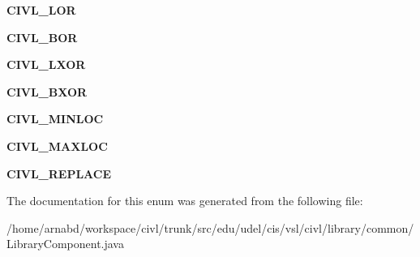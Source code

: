 \begin{DoxyCompactItemize}
\item 
\hypertarget{enumedu_1_1udel_1_1cis_1_1vsl_1_1civl_1_1library_1_1common_1_1LibraryComponent_1_1CIVLOperator_a0f51d482111de402fe99ec63ffc2816d}{}{\bfseries C\+I\+V\+L\+\_\+\+L\+O\+R}\label{enumedu_1_1udel_1_1cis_1_1vsl_1_1civl_1_1library_1_1common_1_1LibraryComponent_1_1CIVLOperator_a0f51d482111de402fe99ec63ffc2816d}

\item 
\hypertarget{enumedu_1_1udel_1_1cis_1_1vsl_1_1civl_1_1library_1_1common_1_1LibraryComponent_1_1CIVLOperator_a96b2269335390a319d3dca8747746c29}{}{\bfseries C\+I\+V\+L\+\_\+\+B\+O\+R}\label{enumedu_1_1udel_1_1cis_1_1vsl_1_1civl_1_1library_1_1common_1_1LibraryComponent_1_1CIVLOperator_a96b2269335390a319d3dca8747746c29}

\item 
\hypertarget{enumedu_1_1udel_1_1cis_1_1vsl_1_1civl_1_1library_1_1common_1_1LibraryComponent_1_1CIVLOperator_ab5b9c8c75602be56234c81f350859cab}{}{\bfseries C\+I\+V\+L\+\_\+\+L\+X\+O\+R}\label{enumedu_1_1udel_1_1cis_1_1vsl_1_1civl_1_1library_1_1common_1_1LibraryComponent_1_1CIVLOperator_ab5b9c8c75602be56234c81f350859cab}

\item 
\hypertarget{enumedu_1_1udel_1_1cis_1_1vsl_1_1civl_1_1library_1_1common_1_1LibraryComponent_1_1CIVLOperator_abb48170259ae48585d3ccee12a7c1a1d}{}{\bfseries C\+I\+V\+L\+\_\+\+B\+X\+O\+R}\label{enumedu_1_1udel_1_1cis_1_1vsl_1_1civl_1_1library_1_1common_1_1LibraryComponent_1_1CIVLOperator_abb48170259ae48585d3ccee12a7c1a1d}

\item 
\hypertarget{enumedu_1_1udel_1_1cis_1_1vsl_1_1civl_1_1library_1_1common_1_1LibraryComponent_1_1CIVLOperator_a44a1e3c15409f3e1e308d2633e2cde72}{}{\bfseries C\+I\+V\+L\+\_\+\+M\+I\+N\+L\+O\+C}\label{enumedu_1_1udel_1_1cis_1_1vsl_1_1civl_1_1library_1_1common_1_1LibraryComponent_1_1CIVLOperator_a44a1e3c15409f3e1e308d2633e2cde72}

\item 
\hypertarget{enumedu_1_1udel_1_1cis_1_1vsl_1_1civl_1_1library_1_1common_1_1LibraryComponent_1_1CIVLOperator_a86426b0d99dc68c7ac6bf0c41603b6e8}{}{\bfseries C\+I\+V\+L\+\_\+\+M\+A\+X\+L\+O\+C}\label{enumedu_1_1udel_1_1cis_1_1vsl_1_1civl_1_1library_1_1common_1_1LibraryComponent_1_1CIVLOperator_a86426b0d99dc68c7ac6bf0c41603b6e8}

\item 
\hypertarget{enumedu_1_1udel_1_1cis_1_1vsl_1_1civl_1_1library_1_1common_1_1LibraryComponent_1_1CIVLOperator_aa5f7370a49e1e040ef59e9057c9ce6e9}{}{\bfseries C\+I\+V\+L\+\_\+\+R\+E\+P\+L\+A\+C\+E}\label{enumedu_1_1udel_1_1cis_1_1vsl_1_1civl_1_1library_1_1common_1_1LibraryComponent_1_1CIVLOperator_aa5f7370a49e1e040ef59e9057c9ce6e9}

\end{DoxyCompactItemize}


The documentation for this enum was generated from the following file\+:\begin{DoxyCompactItemize}
\item 
/home/arnabd/workspace/civl/trunk/src/edu/udel/cis/vsl/civl/library/common/Library\+Component.\+java\end{DoxyCompactItemize}
